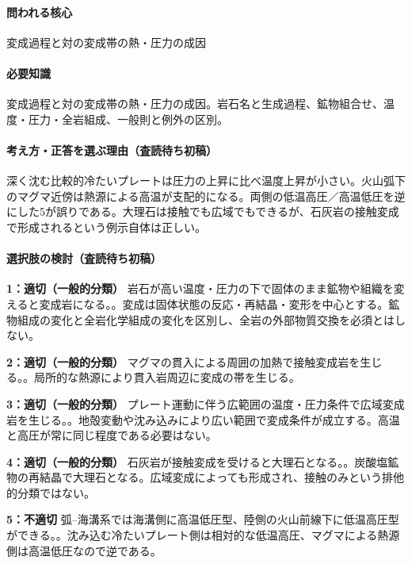 \paragraph{問われる核心} 変成過程と対の変成帯の熱・圧力の成因

\paragraph{必要知識} 変成過程と対の変成帯の熱・圧力の成因。岩石名と生成過程、鉱物組合せ、温度・圧力・全岩組成、一般則と例外の区別。

\paragraph{考え方・正答を選ぶ理由（査読待ち初稿）} 深く沈む比較的冷たいプレートは圧力の上昇に比べ温度上昇が小さい。火山弧下のマグマ近傍は熱源による高温が支配的になる。両側の低温高圧／高温低圧を逆にした5が誤りである。大理石は接触でも広域でもできるが、石灰岩の接触変成で形成されるという例示自体は正しい。

\paragraph{選択肢の検討（査読待ち初稿）}\mbox{}\par

\noindent\textbf{1：適切（一般的分類）} 岩石が高い温度・圧力の下で固体のまま鉱物や組織を変えると変成岩になる。。変成は固体状態の反応・再結晶・変形を中心とする。鉱物組成の変化と全岩化学組成の変化を区別し、全岩の外部物質交換を必須とはしない。\par

\noindent\textbf{2：適切（一般的分類）} マグマの貫入による周囲の加熱で接触変成岩を生じる。。局所的な熱源により貫入岩周辺に変成の帯を生じる。\par

\noindent\textbf{3：適切（一般的分類）} プレート運動に伴う広範囲の温度・圧力条件で広域変成岩を生じる。。地殻変動や沈み込みにより広い範囲で変成条件が成立する。高温と高圧が常に同じ程度である必要はない。\par

\noindent\textbf{4：適切（一般的分類）} 石灰岩が接触変成を受けると大理石となる。。炭酸塩鉱物の再結晶で大理石となる。広域変成によっても形成され、接触のみという排他的分類ではない。\par

\noindent\textbf{5：不適切} 弧–海溝系では海溝側に高温低圧型、陸側の火山前線下に低温高圧型ができる。。沈み込む冷たいプレート側は相対的な低温高圧、マグマによる熱源側は高温低圧なので逆である。\par

